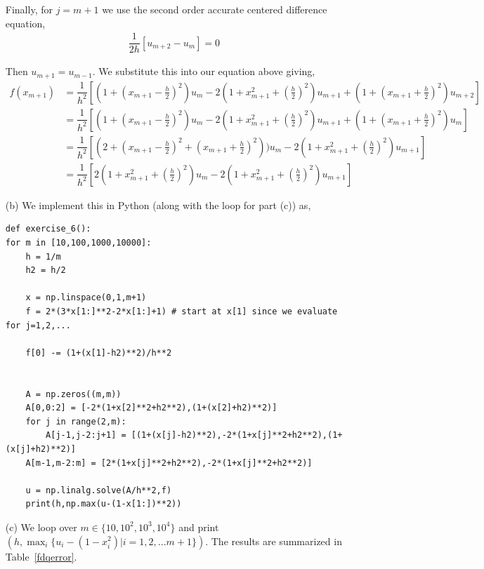 \documentclass[10pt]{article}
\begin{document}
\begin{solution}
\begin{enumerate}
        Finally, for \( j=m+1 \) we use the second order accurate centered difference equation,
        \begin{align*}
            \dfrac{1}{2h}[u_{m+2} - u_{m}] = 0
        \end{align*}
        
        Then \( u_{m+1} = u_{m-1} \). We substitute this into our equation above giving,
        \begin{align*}
            f(x_{m+1}) &= \dfrac{1}{h^2}[(1+(x_{m+1}-\tfrac{h}{2})^2)u_{m} - 2(1+x_{m+1}^2+(\tfrac{h}{2})^2)u_{m+1} + (1+(x_{m+1}+\tfrac{h}{2})^2)u_{m+2}    ] \\ 
            &= \dfrac{1}{h^2}[(1+(x_{m+1}-\tfrac{h}{2})^2)u_{m} - 2(1+x_{m+1}^2+(\tfrac{h}{2})^2)u_{m+1} + (1+(x_{m+1}+\tfrac{h}{2})^2)u_{m}    ] \\ 
            &= \dfrac{1}{h^2}[(2+(x_{m+1}-\tfrac{h}{2})^2 + (x_{m+1}+\tfrac{h}{2})^2))u_{m} - 2(1+x_{m+1}^2+(\tfrac{h}{2})^2)u_{m+1}   ] \\
            &= \dfrac{1}{h^2}[2(1+x_{m+1}^2+(\tfrac{h}{2})^2)u_{m} - 2(1+x_{m+1}^2+(\tfrac{h}{2})^2)u_{m+1}   ]
        \end{align*}


   \item[(b)] We implement this in Python (along with the loop for part (c)) as,
        \begin{lstlisting}
def exercise_6():
for m in [10,100,1000,10000]:
    h = 1/m
    h2 = h/2

    x = np.linspace(0,1,m+1)
    f = 2*(3*x[1:]**2-2*x[1:]+1) # start at x[1] since we evaluate for j=1,2,...

    f[0] -= (1+(x[1]-h2)**2)/h**2


    A = np.zeros((m,m))
    A[0,0:2] = [-2*(1+x[2]**2+h2**2),(1+(x[2]+h2)**2)]
    for j in range(2,m):
        A[j-1,j-2:j+1] = [(1+(x[j]-h2)**2),-2*(1+x[j]**2+h2**2),(1+(x[j]+h2)**2)]
    A[m-1,m-2:m] = [2*(1+x[j]**2+h2**2),-2*(1+x[j]**2+h2**2)]

    u = np.linalg.solve(A/h**2,f)
    print(h,np.max(u-(1-x[1:])**2))
        \end{lstlisting}

    \item[(c)]
        We loop over \( m\in\{10,10^2,10^3,10^4\} \) and print \( (h,\max_i\{u_i-(1-x_i^2)| i=1,2,...m+1\}) \). The results are summarized in Table~\ref{fdqerror}.


\end{enumerate}
\end{solution}
\end{document}
